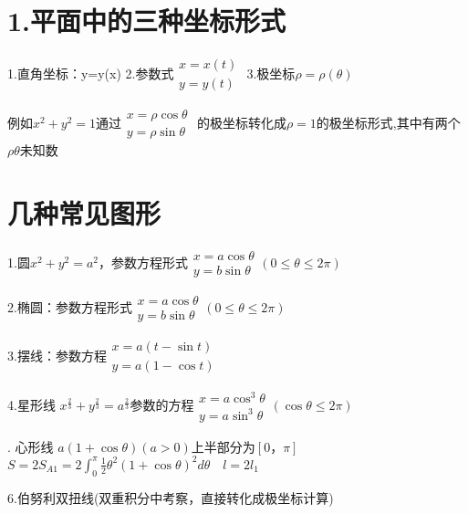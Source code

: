\documentclass[a4paper,11pt]{book}
\begin{document}
\section*{1.平面中的三种坐标形式}

1.直角坐标：y=y(x)
2.参数式$\begin{array}{l}
    x=x(t) \\
    y=y(t)
    \end{array}$
3.极坐标$\rho=\rho(\theta)$

例如$x^{2}+y^{2}=1$通过$\begin{array}{l}
    x=\rho \cos \theta \\
    y=\rho \sin \theta
    \end{array}$
的极坐标转化成$\rho = 1 $的极坐标形式,其中有两个$\rho \theta$未知数

\section*{几种常见图形}

1.圆$x^{2}+y^{2}=a^{2}$，参数方程形式$\begin{array}{c}
x=a\cos \theta \\
y=b \sin \theta 
\end{array}
$$(0 \le \theta \le 2\pi)$

\noindent 2.椭圆：$\displaystyle{}$参数方程形式$\begin{array}{c}
    x=a\cos \theta \\
    y=b \sin \theta 
    \end{array}
    $$(0 \le \theta \le 2\pi)$


\noindent 3.摆线：参数方程$\displaystyle{\begin{array}{l}
    x=a(t-\sin t) \\
    y=a(1-\cos t)
    \end{array}}$

\noindent 4.星形线 $x^{\frac{2}{3}}+y^{\frac{2}{3}}=a^{\frac{2}{3}}$参数的方程$\begin{array}{l}
    x=a \cos ^{3} \theta \\
    y=a \sin ^{3} \theta
    \end{array}$$(\cos \theta \le 2 \pi)$
    
. 心形线 $a(1+\cos \theta) (a>0)$上半部分为$[0，\pi]$
$S=2S_{A1}=2\int _{0}^{\pi} \frac{1}{2}\theta^{2}(1+\cos \theta)^{2}d \theta \quad l=2l_{1}$

\noindent 6.伯努利双扭线(双重积分中考察，直接转化成极坐标计算)
\end{document}
